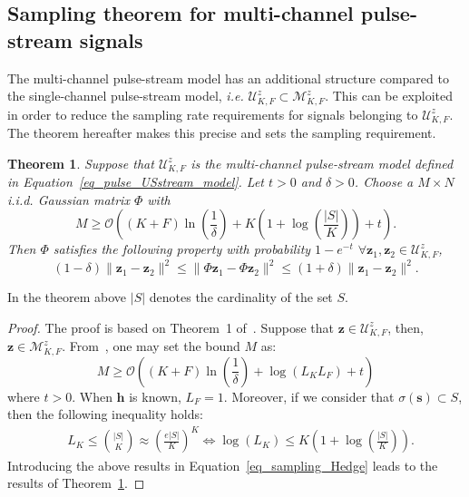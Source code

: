 \documentclass{article}
\newtheorem{theorem}{Theorem}
\newcommand{\ie}{\textit{i.e.}}
\newcommand{\vect}[1]{\bm{#1}}
\newcommand{\mat}[1]{\mathsf{#1}}
\theoremstyle{definition}
\begin{document}
\subsection{Sampling theorem for multi-channel pulse-stream signals}
\label{subsec_sampling_pulse_stream}
The multi-channel pulse-stream model has an additional structure compared to the single-channel pulse-stream model, \ie{} $\mathcal{U}^z_{K,F} \subset \mathcal{M}^z_{K,F}$. This can be exploited in order to reduce the sampling rate requirements for signals belonging to $\mathcal{U}^z_{K,F}$. The theorem hereafter makes this precise and sets the sampling requirement.
\begin{theorem}
	\label{th_stream_pulse_us}
	Suppose that $\mathcal{U}^z_{K,F}$ is the multi-channel pulse-stream model defined in Equation~\eqref{eq_pulse_USstream_model}. Let $t > 0$ and $\delta > 0$. Choose a $M \times N$ \textit{i.i.d.} Gaussian matrix $\mat{\Phi}$ with 
	\begin{equation*}
	M \geq \mathcal{O} \left(\left(K + F\right) \ln \left(\frac{1}{\delta} \right) + K \left( 1 + \log \left(\frac{|S|}{K}\right)\right) + t\right).
	\end{equation*} 
	Then $\mat{\Phi}$ satisfies the following property with probability $1-e^{-t}$ $\forall \vect{z}_1, \vect{z}_2 \in \mathcal{U}^z_{K,F}$, 
	\begin{equation*}
	\left(1- \delta\right) \| \vect{z}_1 - \vect{z}_2\|^2 \leq \| \mat{\Phi} \vect{z}_1 - \mat{\Phi} \vect{z}_2\|^2\leq \left(1+ \delta\right) \| \vect{z}_1 - \vect{z}_2\|^2.
	\end{equation*}
\end{theorem}
In the theorem above $|S|$ denotes the cardinality of the set $S$.
\begin{proof}
	The proof is based on Theorem~\num{1} of~\cite{Hedge_TSP_2011}. Suppose that $\vect{z} \in \mathcal{U}^z_{K,F}$, then, $\vect{z} \in \mathcal{M}^z_{K,F}$. From~\cite{Hedge_TSP_2011}, one may set the bound $M$ as:
	\begin{equation}
		\label{eq_sampling_Hedge}
		M \geq \mathcal{O} \left(\left(K + F\right) \ln \left(\frac{1}{\delta}\right) + \log \left(L_K L_F\right) + t\right)
	\end{equation} 
	where $t > 0$. When $\vect{h}$ is known, $L_F = 1$. Moreover, if we consider that $\sigma \left(\vect{s}\right) \subset S$, then the following inequality holds:
	\begin{align*}
		&L_K \leq {{|S|}\choose{K}} \approx \left(\frac{e|S|}{K}\right)^K 
		\Leftrightarrow  \log \left(L_K\right) \leq K \left(1 + \log\left(\frac{|S|}{K}\right)\right).
	\end{align*}
	Introducing the above results in Equation~\eqref{eq_sampling_Hedge} leads to the results of Theorem~\ref{th_stream_pulse_us}.
\end{proof}
\end{document}

